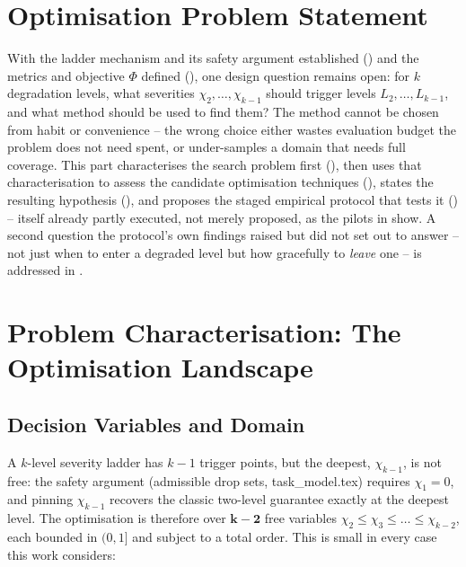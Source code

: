 
\section{Optimisation Problem Statement}
\label{sec:optimisation-problem-statement}

With the ladder mechanism and its safety argument established
() and the metrics
and objective $\Phi$ defined (), one design
question remains open: for $k$ degradation levels, what severities
$\chi_2, \dots, \chi_{k-1}$ should trigger levels $L_2, \dots, L_{k-1}$, and
what method should be used to find them? The method cannot be chosen from
habit or convenience -- the wrong choice either wastes evaluation budget the
problem does not need spent, or under-samples a domain that needs full
coverage. This part characterises the search problem first
(), then uses that characterisation to assess the
candidate optimisation techniques (), states the
resulting hypothesis (), and proposes the staged
empirical protocol that tests it () -- itself already
partly executed, not merely proposed, as the pilots in 
show. A second question the protocol's own findings raised but did not set
out to answer -- not just when to enter a degraded level but how gracefully
to \emph{leave} one -- is addressed in .

\section{Problem Characterisation: The Optimisation Landscape}
\label{sec:landscape}

\subsection{Decision Variables and Domain}

A $k$-level severity ladder has $k - 1$ trigger points, but the deepest,
$\chi_{k-1}$, is not free: the safety argument (admissible drop sets,
task\_model.tex) requires $\chi_1 = 0$, and pinning $\chi_{k-1}$ recovers the
classic two-level guarantee exactly at the deepest level. The optimisation is therefore over $\mathbf{k - 2}$ free variables
$\chi_2 \leq \chi_3 \leq \dots \leq \chi_{k-2}$, each bounded in $(0, 1]$ and
subject to a total order. This is small in every case this work considers:

